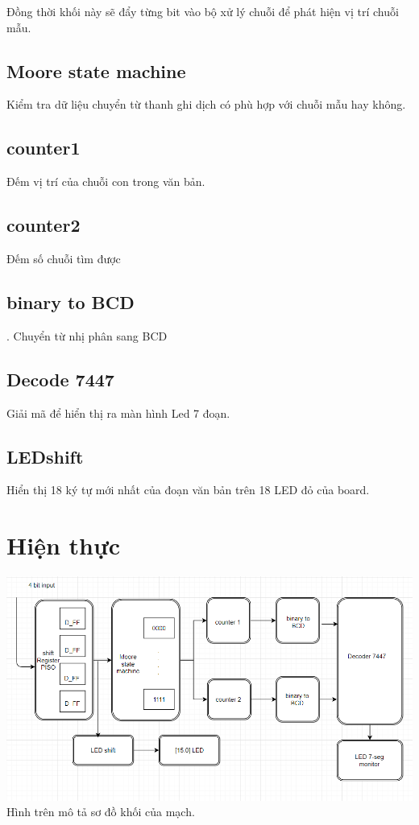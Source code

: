 \documentclass[a4paper]{article}
\begin{document}
	Đồng thời khối này sẽ đẩy từng bit vào bộ xử lý chuỗi để phát hiện vị trí chuỗi mẫu.
	\subsection{Moore state machine}
	Kiểm tra dữ liệu chuyển từ thanh ghi dịch có phù hợp với chuỗi mẫu hay không.\\
	\subsection{counter1}
	Đếm vị trí của chuỗi con trong văn bản.
	\subsection{counter2}
	Đếm số chuỗi tìm được
	\subsection{binary to BCD}.
	Chuyển từ nhị phân sang BCD
	\subsection{Decode 7447}
	Giải mã để hiển thị ra màn hình Led 7 đoạn.
	\subsection{LEDshift}
	Hiển thị 18 ký tự mới nhất của đoạn văn bản trên 18 LED đỏ của board. 

\section{Hiện thực}
	\includegraphics[width=15cm]{block_diagram.png}\\
	Hình trên mô tả sơ đồ khối của mạch.
\end{document}
